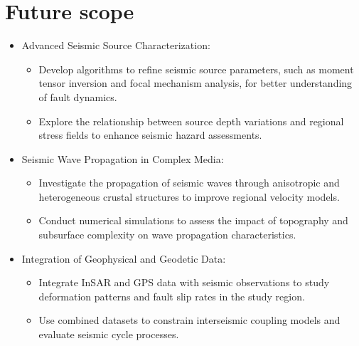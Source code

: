 
\vspace{-5in}
\chapter*{Future scope}



\justifying

\begin{itemize}
    \item Advanced Seismic Source Characterization:
    \begin{itemize}
        \item Develop algorithms to refine seismic source parameters, such as moment tensor inversion and focal mechanism analysis, for better understanding of fault dynamics.
        \item Explore the relationship between source depth variations and regional stress fields to enhance seismic hazard assessments.
    \end{itemize}
    
    \item Seismic Wave Propagation in Complex Media:
    \begin{itemize}
        \item Investigate the propagation of seismic waves through anisotropic and heterogeneous crustal structures to improve regional velocity models.
        \item Conduct numerical simulations to assess the impact of topography and subsurface complexity on wave propagation characteristics.
    \end{itemize}

    \item Integration of Geophysical and Geodetic Data:
    \begin{itemize}
        \item Integrate InSAR and GPS data with seismic observations to study deformation patterns and fault slip rates in the study region.
        \item Use combined datasets to constrain interseismic coupling models and evaluate seismic cycle processes.
    \end{itemize}
    

\end{itemize}
